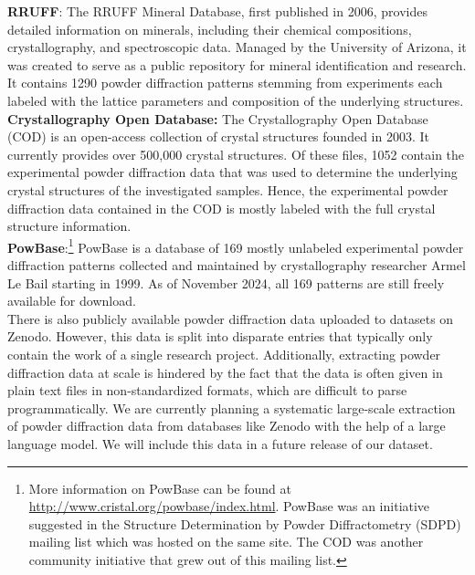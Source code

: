 \textbf{RRUFF}: \cite{RRUFFWeb} The RRUFF Mineral Database, first published in 2006, provides detailed information on minerals, including their chemical compositions, crystallography, and spectroscopic data. \cite{lafuente2015} Managed by the University of Arizona, it was created to serve as a public repository for mineral identification and research. It contains \num{1290} powder diffraction patterns stemming from experiments each labeled with the lattice parameters and composition of the underlying structures. \\

\textbf{Crystallography Open Database:} \cite{CODWeb} The Crystallography Open Database (COD) is an open-access collection of crystal structures founded in 2003\cite{Graulis2009cod}. It currently provides over 500,000 crystal structures. Of these files, 1052 contain the experimental powder diffraction data that was used to determine the underlying crystal structures of the investigated samples. Hence, the experimental powder diffraction data contained in the COD is mostly labeled with the full crystal structure information. \\

\textbf{PowBase}:\footnote{More information on PowBase can be found at \url{http://www.cristal.org/powbase/index.html}. PowBase was an initiative suggested in the Structure Determination by Powder Diffractometry (SDPD) mailing list which was hosted on the same site. The COD was another community initiative that grew out of this mailing list.} PowBase is a database of 169 mostly unlabeled experimental powder diffraction patterns collected and maintained by crystallography researcher Armel Le Bail starting in 1999. As of November 2024, all 169 patterns are still freely available for download. \\

There is also publicly available powder diffraction data uploaded to datasets on Zenodo. However, this data is split into disparate entries that typically only contain the work of a single research project. Additionally, extracting powder diffraction data at scale is hindered by the fact that the data is often given in plain text files in non-standardized formats, which are difficult to parse programmatically. We are currently planning a systematic large-scale extraction of powder diffraction data from databases like Zenodo with the help of a large language model. We will include this data in a future release of our dataset.\\

